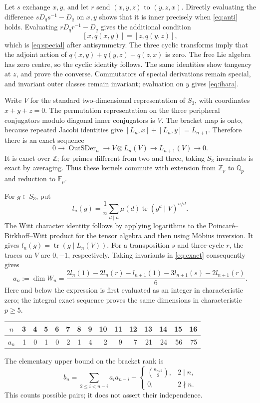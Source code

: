 \documentclass[11pt]{article}
\newcommand{\F}{\mathbb F}
\newcommand{\Q}{\mathbb Q}
\newcommand{\Z}{\mathbb Z}
\theoremstyle{definition}
\theoremstyle{remark}
\begin{document}
Let $s$ exchange $x,y$, and let $r$ send $(x,y,z)$ to $(y,z,x)$.
Directly evaluating the difference $sD_qs^{-1}-D_q$ on $x,y$ shows that
it is inner precisely when \eqref{eq:anti} holds.  Evaluating
$rD_qr^{-1}-D_q$ gives the additional condition
\[
 [x,q(x,y)]=[z,q(y,z)],
\]
which is \eqref{eq:special} after antisymmetry.  The three cyclic
transforms imply that the adjoint action of
$q(x,y)+q(y,z)+q(z,x)$ is zero.  The free Lie algebra has zero centre,
so the cyclic identity follows.  The same identities show tangency at
$z$, and prove the converse.  Commutators of special derivations remain
special, and invariant outer classes remain invariant; evaluation on $y$
gives \eqref{eq:ihara}.

Write $V$ for the standard two-dimensional representation of $S_3$, with
coordinates $x+y+z=0$.  The permutation representation on the three
peripheral conjugators modulo diagonal inner conjugators is $V$.
The bracket map is onto, because repeated Jacobi identities give
$[L_n,x]+[L_n,y]=L_{n+1}$.  Therefore there is an exact sequence
\begin{equation}
0\longrightarrow\operatorname{OutSDer}_n
 \longrightarrow V\otimes L_n(V)\longrightarrow L_{n+1}(V)
 \longrightarrow0.\label{eq:exact}
\end{equation}
It is exact over $\Z$; for primes different from two and three, taking
$S_3$ invariants is exact by averaging.  Thus these kernels commute with
extension from $\Z_p$ to $\Q_p$ and reduction to $\F_p$.

For $g\in S_3$, put
\[
 l_n(g)=\frac1n\sum_{d\mid n}\mu(d)
                  \operatorname{tr}(g^d\mid V)^{n/d}.
\]
The Witt character identity follows by applying logarithms to the
Poincar\'e--Birkhoff--Witt product for the tensor algebra and then using
M\"obius inversion.  It gives $l_n(g)=\operatorname{tr}(g\mid L_n(V))$.
For a transposition $s$ and three-cycle $r$, the traces on $V$ are $0,-1$,
respectively.  Taking invariants in \eqref{eq:exact} consequently gives
\begin{equation}
 a_n:=\dim W_n=
 \frac{2l_n(1)-2l_n(r)-l_{n+1}(1)-3l_{n+1}(s)-2l_{n+1}(r)}6.
 \label{eq:dimension}
\end{equation}
Here and below the expression is first evaluated as an integer in
characteristic zero; the integral exact sequence proves the same
dimensions in characteristic $p\geq5$.

\begin{center}
\begin{tabular}{c|rrrrrrrrrrrrrr}
$n$&3&4&5&6&7&8&9&10&11&12&13&14&15&16\\\hline
$a_n$&1&0&1&0&2&1&4&2&9&7&21&24&56&75
\end{tabular}
\end{center}
The elementary upper bound on the bracket rank is
\begin{equation}
 b_n=\sum_{2\leq i<n-i}a_i a_{n-i}
       +\begin{cases}\binom{a_{n/2}}2,&2\mid n,\\0,&2\nmid n.
       \end{cases}\label{eq:raw}
\end{equation}
This counts possible pairs; it does not assert their independence.
\end{document}
